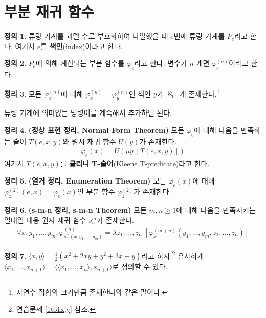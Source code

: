 \documentclass[b5paper, 11pt]{book}
\theoremstyle{definition}
\newtheorem{defn}{정의}[chapter]
\newtheorem{thm}[defn]{정리}
\newenvironment{pf*}{\pushQED{\qed}\pf}
{\popQED\endpf}
\begin{document}
\section{부분 재귀 함수}
\begin{defn}
    튜링 기계를 괴델 수로 부호화하여 나열했을 때 $e$번째 튜링 기계를 $P_e$라고 한다. 여기서 $e$를 \textbf{색인}(index)이라고 한다.
\end{defn}
\begin{defn}
    $P_e$에 의해 계산되는 부분 함수를 $\varphi_e$라고 한다. 변수가 $n$ 개면 $\varphi_e^{(n)}$이라고 한다.
\end{defn}
\begin{thm}
    모든 $\varphi_x^{(n)}$에 대해 $\varphi_x^{(n)} = \varphi_y^{(n)}$인 색인 $y$가 $\aleph_0$ 개 존재한다.\footnote{자연수 집합의 크기만큼 존재한다와 같은 말이다.}
\end{thm}
\begin{pf*}
    튜링 기계에 의미없는 명령어를 계속해서 추가하면 된다.
\end{pf*}
\begin{thm}
    \textbf{(정상 표현 정리, Normal Form Theorem)} 모든 $\varphi_e$에 대해 다음을 만족하는 술어 $T(e, x, y )$와 원시 재귀 함수 $U(y)$가 존재한다.
    \begin{align*}
        \varphi_e (x) = U (\mu y \; [T(e,x,y)])
    \end{align*}
    여기서 $T(e, x, y)$를 \textbf{클리니 T-술어}(Kleene T-predicate)라고 한다.
\end{thm}
\begin{thm}
    \textbf{(열거 정리, Enumeration Theorem)} 
    모든 $\varphi_e (x)$에 대해 $\varphi_z^{(2)} (e, x) = \varphi_e (x)$인 부분 함수 $\varphi_z^{(2)}$가 존재한다.
\end{thm}
\begin{thm}
    \textbf{(s-m-n 정리, s-m-n Theorem)} 모든 $m, n \ge 1$에 대해 다음을 만족시키는 일대일 대응 원시 재귀 함수 $s_n^m$가 존재한다. 
    \begin{align*}
        \forall x, y_1, \ldots, y_m, \varphi^{(n)}_{s_n^m (x, y_1, \ldots, y_m)} = \lambda z_1, \ldots, z_n \; [\varphi_x^{(m+n)} (y_1, \ldots, y_m, z_1, \ldots, z_n)]
    \end{align*} 
\end{thm}
\begin{defn}
    $\langle x, y \rangle =  \frac{1}{2}(x^2 + 2xy + y^2 + 3x + y)$라고 하자.\footnote{연습문제 \ref{1to1x,y} 참조.} 유사하게 $ \langle x_1, \ldots, x_{n+1} \rangle = \langle \langle x_1 , \ldots, x_n \rangle,  x_{n+1} \rangle$로 정의할 수 있다. 
\end{defn}
\end{document}
